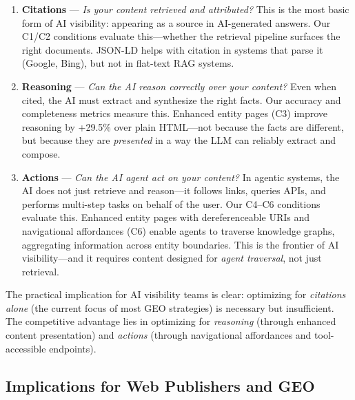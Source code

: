 \documentclass[runningheads]{llncs}
\begin{document}
\begin{enumerate}
    \item \textbf{Citations} --- \emph{Is your content retrieved and
          attributed?} This is the most basic form of AI visibility:
          appearing as a source in AI-generated answers. Our C1/C2
          conditions evaluate this---whether the retrieval pipeline
          surfaces the right documents. JSON-LD helps with citation
          in systems that parse it (Google, Bing), but not in flat-text
          RAG systems.
    \item \textbf{Reasoning} --- \emph{Can the AI reason correctly
          over your content?} Even when cited, the AI must extract
          and synthesize the right facts. Our accuracy and completeness
          metrics measure this. Enhanced entity pages (C3) improve
          reasoning by +29.5\% over plain HTML---not because the facts
          are different, but because they are \emph{presented} in a way
          the LLM can reliably extract and compose.
    \item \textbf{Actions} --- \emph{Can the AI agent act on your
          content?} In agentic systems, the AI does not just
          retrieve and reason---it follows links, queries APIs, and
          performs multi-step tasks on behalf of the user. Our C4--C6
          conditions evaluate this. Enhanced entity pages with
          dereferenceable URIs and navigational affordances (C6)
          enable agents to traverse knowledge graphs, aggregating
          information across entity boundaries. This is the frontier
          of AI visibility---and it requires content designed for
          \emph{agent traversal}, not just retrieval.
\end{enumerate}

The practical implication for AI visibility teams is clear:
optimizing for \emph{citations alone} (the current focus of most
GEO strategies) is necessary but insufficient. The competitive
advantage lies in optimizing for \emph{reasoning} (through enhanced
content presentation) and \emph{actions} (through navigational
affordances and tool-accessible endpoints).

\subsection{Implications for Web Publishers and GEO}
\end{document}
